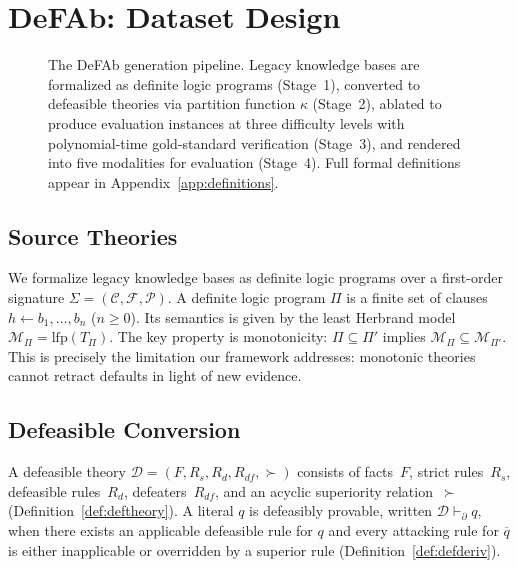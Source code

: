\documentclass{article}
\theoremstyle{definition}
\newcommand{\D}{\mathcal{D}}
\newcommand{\Rs}{R_s}
\newcommand{\Rd}{R_d}
\newcommand{\Rdf}{R_{df}}
\newcommand{\pPartial}{\vdash_{\partial}}
\newcommand{\comp}[1]{\overline{#1}}
\begin{document}
\section{DeFAb: Dataset Design}\label{sec:design}

\begin{figure}[t]
\centering
\resizebox{\textwidth}{!}{}
\caption{The DeFAb generation pipeline. Legacy knowledge bases are formalized as definite logic programs (Stage~1), converted to defeasible theories via partition function $\kappa$ (Stage~2), ablated to produce evaluation instances at three difficulty levels with polynomial-time gold-standard verification (Stage~3), and rendered into five modalities for evaluation (Stage~4). Full formal definitions appear in Appendix~\ref{app:definitions}.}
\label{fig:pipeline}
\end{figure}


\subsection{Source Theories}\label{subsec:source}

We formalize legacy knowledge bases as definite logic programs over a first-order signature $\Sigma = (\mathcal{C}, \mathcal{F}, \mathcal{P})$. A definite logic program $\Pi$ is a finite set of clauses $h \leftarrow b_1, \ldots, b_n$ ($n \geq 0$). Its semantics is given by the least Herbrand model $\mathcal{M}_\Pi = \mathrm{lfp}(T_\Pi)$. The key property is monotonicity: $\Pi \subseteq \Pi'$ implies $\mathcal{M}_\Pi \subseteq \mathcal{M}_{\Pi'}$. This is precisely the limitation our framework addresses: monotonic theories cannot retract defaults in light of new evidence.


\subsection{Defeasible Conversion}\label{subsec:conversion}

A defeasible theory $\D = (F, \Rs, \Rd, \Rdf, {\succ})$ consists of facts~$F$, strict rules~$\Rs$, defeasible rules~$\Rd$, defeaters~$\Rdf$, and an acyclic superiority relation~$\succ$ (Definition~\ref{def:deftheory}). A literal $q$ is defeasibly provable, written $\D \pPartial q$, when there exists an applicable defeasible rule for $q$ and every attacking rule for $\comp{q}$ is either inapplicable or overridden by a superior rule (Definition~\ref{def:defderiv}).
\end{document}
